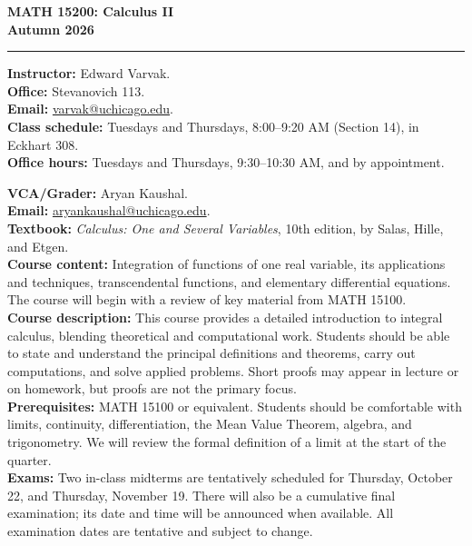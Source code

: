 \documentclass[12pt,letterpaper]{article}
\newcommand{\field}[1]{\textbf{#1}}
\begin{document}
\begin{center}
  \textbf{\large MATH 15200: Calculus II}\\
  \textbf{Autumn 2026}
\end{center}

\vspace{0.4em}
\hrule
\vspace{1.2em}

\field{Instructor:} Edward Varvak.\\
\field{Office:} Stevanovich 113.\\
\field{Email:} \href{mailto:varvak@uchicago.edu}{varvak@uchicago.edu}.\\
\field{Class schedule:} Tuesdays and Thursdays, 8:00--9:20 AM (Section 14), in Eckhart 308.\\
\field{Office hours:} Tuesdays and Thursdays, 9:30--10:30 AM, and by appointment.

\vspace{0.5em}
\field{VCA/Grader:} Aryan Kaushal.\\
\field{Email:} \href{mailto:aryankaushal@uchicago.edu}{aryankaushal@uchicago.edu}.\\

\field{Textbook:} \textit{Calculus: One and Several Variables}, 10th edition, by Salas, Hille, and Etgen.\\

\field{Course content:} Integration of functions of one real variable, its applications and techniques, transcendental functions, and elementary differential equations. The course will begin with a review of key material from MATH 15100.\\

\field{Course description:} This course provides a detailed introduction to integral calculus, blending theoretical and computational work. Students should be able to state and understand the principal definitions and theorems, carry out computations, and solve applied problems. Short proofs may appear in lecture or on homework, but proofs are not the primary focus.\\

\field{Prerequisites:} MATH 15100 or equivalent. Students should be comfortable with limits, continuity, differentiation, the Mean Value Theorem, algebra, and trigonometry. We will review the formal definition of a limit at the start of the quarter.\\

\field{Exams:} Two in-class midterms are tentatively scheduled for Thursday, October 22, and Thursday, November 19. There will also be a cumulative final examination; its date and time will be announced when available. All examination dates are tentative and subject to change.\\
\end{document}
